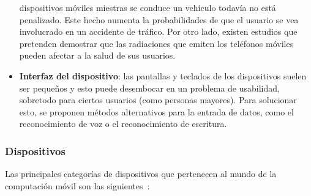 \begin{itemize}
dispositivos móviles miestras se conduce un vehículo todavía no está
penalizado. Este hecho aumenta la probabilidades de que el usuario se vea
involucrado en un accidente de tráfico. Por otro lado, existen estudios que
pretenden demostrar que las radiaciones que emiten los teléfonos móviles 
pueden afectar a la salud de sus usuarios.
\item \textbf{Interfaz del dispositivo}: las pantallas y teclados de los
dispositivos suelen ser pequeños y esto puede desembocar en un problema de
usabilidad, sobretodo para ciertos usuarios (como personas mayores).
Para solucionar esto, se proponen métodos alternativos para la entrada de
datos, como el reconocimiento de voz o el reconocimiento de escritura.
\end{itemize}

  \subsubsection{Dispositivos}
Las principales categorías de dispositivos que pertenecen al mundo de la
computación móvil son las siguientes~\cite{bib:wikiMobileComputing}:
